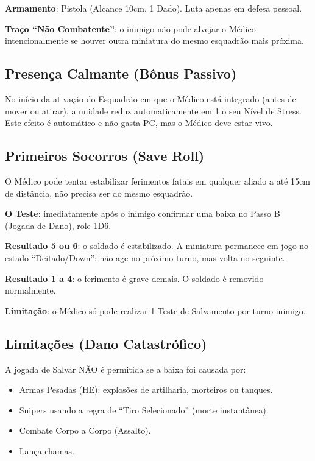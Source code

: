 \textbf{Armamento}: Pistola (Alcance 10cm, 1 Dado). Luta apenas em defesa pessoal.

\textbf{Traço ``Não Combatente''}: o inimigo não pode alvejar o Médico intencionalmente se houver outra miniatura do mesmo esquadrão mais próxima.

\subsection{Presença Calmante (Bônus Passivo)}

No início da ativação do Esquadrão em que o Médico está integrado (antes de mover ou atirar), a unidade reduz automaticamente em 1 o seu Nível de Stress. Este efeito é automático e não gasta PC, mas o Médico deve estar vivo.

\subsection{Primeiros Socorros (Save Roll)}

O Médico pode tentar estabilizar ferimentos fatais em qualquer aliado a até 15cm de distância, não precisa ser do mesmo esquadrão.

\textbf{O Teste}: imediatamente após o inimigo confirmar uma baixa no Passo B (Jogada de Dano), role 1D6.

\textbf{Resultado 5 ou 6}: o soldado é estabilizado. A miniatura permanece em jogo no estado ``Deitado/Down'': não age no próximo turno, mas volta no seguinte.

\textbf{Resultado 1 a 4}: o ferimento é grave demais. O soldado é removido normalmente.

\textbf{Limitação}: o Médico só pode realizar 1 Teste de Salvamento por turno inimigo.

\subsection{Limitações (Dano Catastrófico)}

A jogada de Salvar NÃO é permitida se a baixa foi causada por:

\begin{itemize}[leftmargin=1.2cm]
  \item Armas Pesadas (HE): explosões de artilharia, morteiros ou tanques.
  \item Snipers usando a regra de ``Tiro Selecionado'' (morte instantânea).
  \item Combate Corpo a Corpo (Assalto).
  \item Lança-chamas.
\end{itemize}

